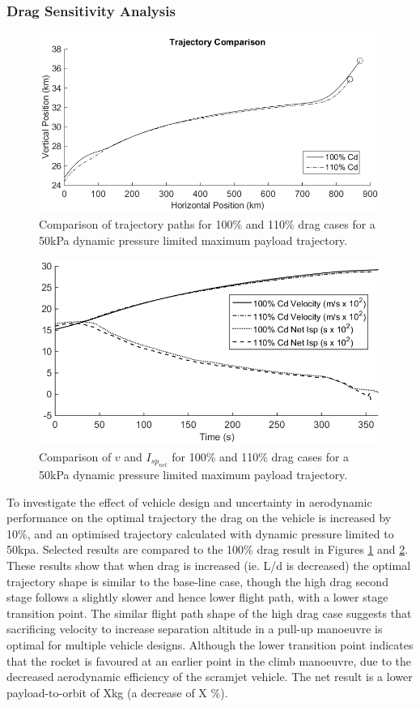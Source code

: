 \documentclass[]{aiaa-tc}
\newcommand{\PayloadToOrbitHighDrag}{X}
\begin{document}
\subsubsection{Drag Sensitivity Analysis}\label{subsection:dragvariation}
\begin{figure}[ht]
	\centering
	\includegraphics[width=.7\linewidth]{DragComparisonTraj}
	\caption{Comparison of trajectory paths for 100\% and 110\% drag cases for a 50kPa dynamic pressure limited maximum payload trajectory.}
	\label{fig:DragCompTraj}
\end{figure}

\begin{figure}[ht]
	\centering
	\includegraphics[width=.6\linewidth]{DragComparisonOther}
	\caption{Comparison of $v$ and $I_{sp_{net}}$ for 100\% and 110\% drag cases for a 50kPa dynamic pressure limited maximum payload trajectory.}
	\label{fig:DragCompOther}
\end{figure}

To investigate the effect of vehicle design and uncertainty in aerodynamic performance on the optimal trajectory the drag on the vehicle is increased by 10\%, and an optimised trajectory calculated with dynamic pressure limited to 50kpa. Selected results are compared to the 100\% drag result in Figures \ref{fig:DragCompTraj} and \ref{fig:DragCompOther}. 
These results show that when drag is increased (ie. L/d is decreased) the optimal trajectory shape is similar to the base-line case, though the high drag second stage follows a slightly slower and hence lower flight path, with a lower stage transition point. The similar flight path shape of the high drag case suggests that sacrificing velocity to increase separation altitude in a pull-up manoeuvre is optimal for multiple vehicle designs. Although the lower transition point indicates that the rocket is favoured at an earlier point in the climb manoeuvre, due to the decreased aerodynamic efficiency of the scramjet vehicle. 
The net result is  a lower payload-to-orbit of \PayloadToOrbitHighDrag kg (a decrease of X \%). 
\end{document}
